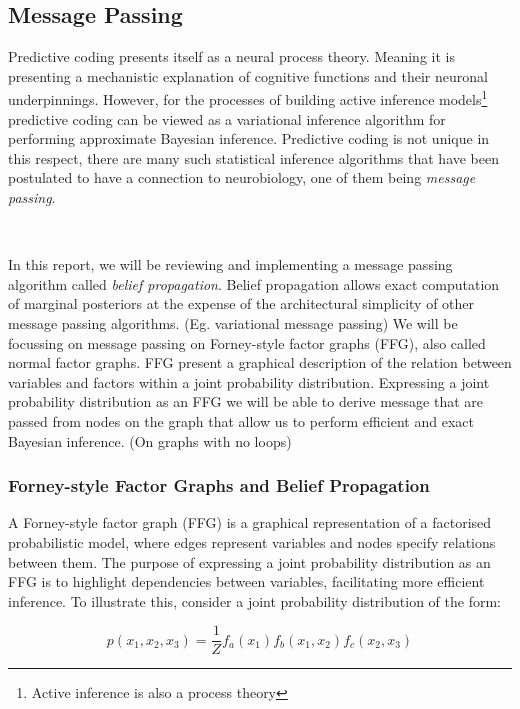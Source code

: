 \documentclass{article}
\begin{document}
\subsection{Message Passing}

Predictive coding presents itself as a neural process theory. Meaning it is presenting a mechanistic explanation of cognitive functions and their neuronal underpinnings. However, for the processes of building active inference models\footnote{Active inference is also a process theory} predictive coding can be viewed as a variational inference algorithm for performing approximate Bayesian inference. Predictive coding is not unique in this respect, there are many such statistical inference algorithms that have been postulated to have a connection to neurobiology, one of them being \textit{message passing}.

\

In this report, we will be reviewing and implementing a message passing algorithm called \textit{belief propagation}. Belief propagation allows exact computation of marginal posteriors at the expense of the architectural simplicity of other message passing algorithms. (Eg. variational message passing) We will be focussing on message passing on Forney-style factor graphs (FFG), also called normal factor graphs. FFG present a graphical description of the relation between variables and factors within a joint probability distribution. Expressing a joint probability distribution as an FFG we will be able to derive message that are passed from nodes on the graph that allow us to perform efficient and exact Bayesian inference. (On graphs with no loops)

\subsubsection{Forney-style Factor Graphs and Belief Propagation}

A Forney-style factor graph (FFG) is a graphical representation of a factorised probabilistic model, where edges represent variables and nodes specify relations between them. The purpose of expressing a joint probability distribution as an FFG is to highlight dependencies between variables, facilitating more efficient inference. To illustrate this, consider a joint probability distribution of the form:

\begin{equation}\label{eq:ffg_inference_example}
	p(x_1, x_2, x_3) = \frac{1}{Z}f_a(x_1)f_b(x_1, x_2)f_c(x_2, x_3)
\end{equation}
\end{document}
